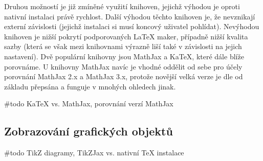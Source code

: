 Druhou možností je již zmíněné využití knihoven, jejichž výhodou je oproti nativní instalaci právě rychlost. Další
výhodou těchto knihoven je, že nevznikají externí závislosti (jejichž instalaci si musí koncový uživatel pohlídat).
Nevýhodou knihoven je nižší pokrytí podporovaných \LaTeX{} maker, případně nižší kvalita sazby (která se však mezi
knihovnami výrazně liší také v závislosti na jejich nastavení). Dvě populární knihovny jsou MathJax a KaTeX, které
dále blíže porovnáme. U knihovny MathJax navíc je vhodné oddělit od sebe pro účely porovnání MathJax 2.x a MathJax 3.x,
protože novější velká verze je dle \cite{mathjax3-docs} od základu přepsána a funguje v mnohých ohledech jinak.

\#todo KaTeX vs. MathJax, porovnání verzí MathJax

\subsection{Zobrazování grafických objektů}

\#todo TikZ diagramy, TikZJax vs. nativní TeX instalace
